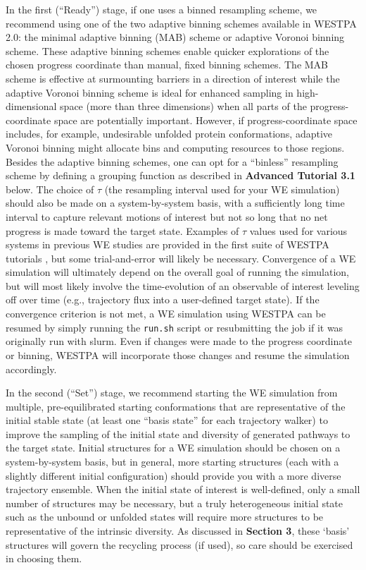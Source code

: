 In the first (“Ready”) stage, if one uses a binned resampling scheme, we recommend using one of the two adaptive binning schemes available in WESTPA 2.0: the minimal adaptive binning (MAB) scheme or adaptive Voronoi binning scheme.
These adaptive binning schemes enable quicker explorations of the chosen progress coordinate than manual, fixed binning schemes. 
The MAB scheme is effective at surmounting barriers in a direction of interest \citep{torrillo_minimal_2021} while the adaptive Voronoi binning scheme \citep{zhang_exact_2010} is ideal for enhanced sampling in high-dimensional space (more than three dimensions) when all parts of the progress-coordinate space are potentially important. 
However, if progress-coordinate space includes, for example, undesirable unfolded protein conformations, adaptive Voronoi binning might allocate bins and computing resources to those regions. 
Besides the adaptive binning schemes, one can opt for a “binless” resampling scheme by defining a grouping function as described in \textbf{Advanced Tutorial 3.1} below. 
The choice of $\tau$ (the resampling interval used for your WE simulation) should also be made on a system-by-system basis, with a sufficiently long time interval to capture relevant motions of interest but not so long that no net progress is made toward the target state. 
Examples of $\tau$ values used for various systems in previous WE studies are provided in the first suite of WESTPA tutorials \citep{bogetti_suite_2019}, but some trial-and-error will likely be necessary.
Convergence of a WE simulation will ultimately depend on the overall goal of running the simulation, but will most likely involve the time-evolution of an observable of interest leveling off over time (e.g., trajectory flux into a user-defined target state). 
If the convergence criterion is not met, a WE simulation using WESTPA can be resumed by simply running the \verb|run.sh| script or resubmitting the job if it was originally run with slurm. 
Even if changes were made to the progress coordinate or binning, WESTPA will incorporate those changes and resume the simulation accordingly.

In the second (“Set”) stage, we recommend starting the WE simulation from multiple, pre-equilibrated starting conformations that are representative of the initial stable state (at least one “basis state” for each trajectory walker) to improve the sampling of the initial state and diversity of generated pathways to the target state. 
Initial structures for a WE simulation should be chosen on a system-by-system basis, but in general, more starting structures (each with a slightly different initial configuration) should provide you with a more diverse trajectory ensemble. 
When the initial state of interest is well-defined, only a small number of structures may be necessary, but a truly heterogeneous initial state such as the unbound or unfolded states will require more structures to be representative of the intrinsic diversity.  
As discussed in \textbf{Section 3}, these ‘basis’ structures will govern the recycling process (if used), so care should be exercised in choosing them.

